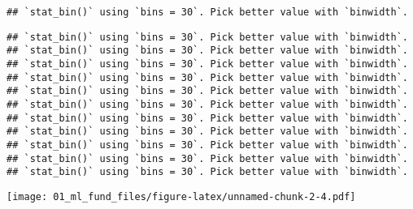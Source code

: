 \documentclass[
]{article}
\newenvironment{Shaded}{\begin{snugshade}}{\end{snugshade}}
\newcommand{\DataTypeTok}[1]{\textcolor[rgb]{0.13,0.29,0.53}{#1}}
\newcommand{\DecValTok}[1]{\textcolor[rgb]{0.00,0.00,0.81}{#1}}
\newcommand{\FloatTok}[1]{\textcolor[rgb]{0.00,0.00,0.81}{#1}}
\newcommand{\KeywordTok}[1]{\textcolor[rgb]{0.13,0.29,0.53}{\textbf{#1}}}
\newcommand{\NormalTok}[1]{#1}
\newcommand{\OperatorTok}[1]{\textcolor[rgb]{0.81,0.36,0.00}{\textbf{#1}}}
\newcommand{\StringTok}[1]{\textcolor[rgb]{0.31,0.60,0.02}{#1}}
\begin{document}
\begin{Shaded}
\end{Shaded}

\begin{verbatim}
## `stat_bin()` using `bins = 30`. Pick better value with `binwidth`.
\end{verbatim}

\begin{verbatim}
## `stat_bin()` using `bins = 30`. Pick better value with `binwidth`.
## `stat_bin()` using `bins = 30`. Pick better value with `binwidth`.
## `stat_bin()` using `bins = 30`. Pick better value with `binwidth`.
## `stat_bin()` using `bins = 30`. Pick better value with `binwidth`.
## `stat_bin()` using `bins = 30`. Pick better value with `binwidth`.
## `stat_bin()` using `bins = 30`. Pick better value with `binwidth`.
## `stat_bin()` using `bins = 30`. Pick better value with `binwidth`.
## `stat_bin()` using `bins = 30`. Pick better value with `binwidth`.
## `stat_bin()` using `bins = 30`. Pick better value with `binwidth`.
## `stat_bin()` using `bins = 30`. Pick better value with `binwidth`.
## `stat_bin()` using `bins = 30`. Pick better value with `binwidth`.
\end{verbatim}

\texttt{[image: 01\_ml\_fund\_files/figure-latex/unnamed-chunk-2-4.pdf]}

\begin{Shaded}
\end{Shaded}
\end{document}

